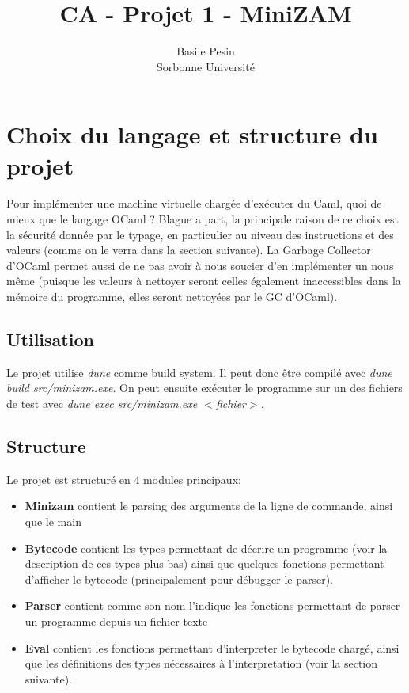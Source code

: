 \documentclass{article}
\title{CA - Projet 1 - MiniZAM}
\author{Basile Pesin\\Sorbonne Université}
\begin{document}
\maketitle

\section{Choix du langage et structure du projet}

Pour implémenter une machine virtuelle chargée d'exécuter du Caml, quoi de mieux que le langage OCaml ? Blague a part, la principale raison de ce choix est la sécurité donnée par le typage, en particulier au niveau des instructions et des valeurs (comme on le verra dans la section suivante). La Garbage Collector d'OCaml permet aussi de ne pas avoir à nous soucier d'en implémenter un nous même (puisque les valeurs à nettoyer seront celles également inaccessibles dans la mémoire du programme, elles seront nettoyées par le GC d'OCaml).\\

\subsection{Utilisation}

Le projet utilise \textit{dune} comme build system. Il peut donc être compilé avec \textit{dune build src/minizam.exe}. On peut ensuite exécuter le programme sur un des fichiers de test avec \textit{dune exec src/minizam.exe $<$fichier$>$}.

\subsection{Structure}

Le projet est structuré en 4 modules principaux:
\begin{itemize}
  \item \textbf{Minizam} contient le parsing des arguments de la ligne de commande, ainsi que le main
  \item \textbf{Bytecode} contient les types permettant de décrire un programme (voir la description de ces types plus bas) ainsi que quelques fonctions permettant d'afficher le bytecode (principalement pour débugger le parser).
  \item \textbf{Parser} contient comme son nom l'indique les fonctions permettant de parser un programme depuis un fichier texte
  \item \textbf{Eval} contient les fonctions permettant d'interpreter le bytecode chargé, ainsi que les définitions des types nécessaires à l'interpretation (voir la section suivante).
\end{itemize}
\end{document}
